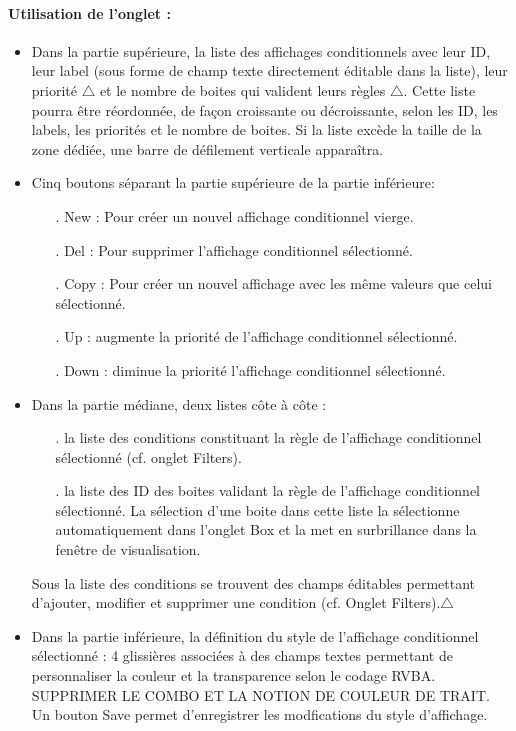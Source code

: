 \documentclass[a4paper]{article}
\begin{document}
\paragraph{Utilisation de l'onglet :}
\begin{itemize}
\item Dans la partie supérieure, la liste des affichages conditionnels avec leur ID, leur label (sous forme de champ texte directement éditable dans la liste), leur priorité $\triangle$ et le nombre de boites qui valident leurs règles $\triangle$. Cette liste pourra être réordonnée, de façon croissante ou décroissante, selon les ID, les labels, les priorités et le nombre de boites. Si la liste excède la taille de la zone dédiée, une barre de défilement verticale apparaîtra.
\item Cinq boutons séparant la partie supérieure de la partie inférieure:
  \begin{itemize}
  \item[.] New : Pour créer un nouvel affichage conditionnel vierge.
  \item[.] Del : Pour supprimer l'affichage conditionnel sélectionné.
  \item[.] Copy : Pour créer un nouvel affichage avec les même valeurs que celui sélectionné.
  \item[.] Up : augmente la priorité de l'affichage conditionnel sélectionné.
  \item[.] Down : diminue la priorité l'affichage conditionnel sélectionné.
  \end{itemize}
\item Dans la partie médiane, deux listes côte à côte :
  \begin{itemize}
  \item[.] la liste des conditions constituant la règle de l'affichage conditionnel sélectionné (cf. onglet Filters).
  \item[.] la liste des ID des boites validant la règle de l'affichage conditionnel sélectionné. La sélection d'une boite dans cette liste la sélectionne automatiquement dans l'onglet Box et la met en surbrillance dans la fenêtre de visualisation.
  \end{itemize}
  Sous la liste des conditions se trouvent des champs éditables permettant d'ajouter, modifier et supprimer une condition (cf. Onglet Filters).$\triangle$
\item Dans la partie inférieure, la définition du style de l'affichage conditionnel sélectionné : 4 glissières associées à des champs textes permettant de personnaliser la couleur et la transparence selon le codage RVBA.\\ SUPPRIMER LE COMBO ET LA NOTION DE COULEUR DE TRAIT.\\Un bouton Save permet d'enregistrer les modfications du style d'affichage.
\end{itemize}
\end{document}
